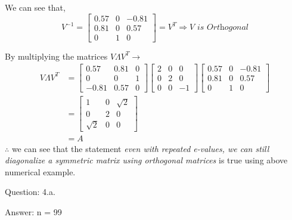 \documentclass[a4paper]{article}
\begin{document}
\begin{qalist}
			We can see that, 
			\begin{equation}
				{V}^{-1} = \begin{bmatrix}0.57 & 0 & -0.81 \\ 0.81 & 0 & 0.57 \\ 0 & 1 & 0 \end{bmatrix} = {V}^{T} \Rightarrow \textit{$V$ is Orthogonal}
			\end{equation}
			
			By multiplying the matrices $V \Lambda {V}^{T} \rightarrow$ 
			\begin{align}
				V \Lambda {V}^{T} &=  \begin{bmatrix} 0.57 & 0.81 & 0 \\ 0 & 0 & 1 \\ -0.81 & 0.57 & 0 \end{bmatrix}   \begin{bmatrix} 2 & 0 & 0\\ 0 & 2 & 0 \\ 0 & 0 & -1 \end{bmatrix}    \begin{bmatrix}0.57 & 0 & -0.81 \\ 0.81 & 0 & 0.57 \\ 0 & 1 & 0 \end{bmatrix} \\ 
				&=  \begin{bmatrix}1 & 0 & \sqrt{2} \\ 0 & 2 & 0 \\ \sqrt{2} & 0 & 0\end{bmatrix} \\ 
				&= A
			\end{align}
			$\therefore$ we can see that the statement \emph{even with repeated e-values, we can still diagonalize a symmetric matrix using orthogonal matrices} is true using above numerical example.
			
			
		\item[Question: 4.a.] \setcounter{equation}{0}
		\item[Answer:] n = 99
		
		\newpage
		

\end{qalist}
\end{document}
